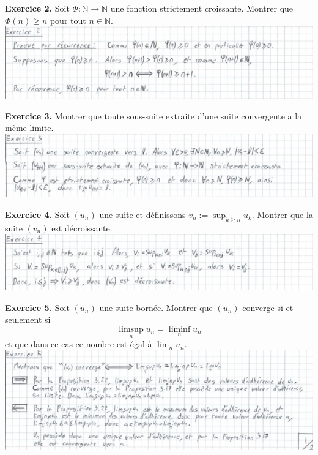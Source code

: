 \documentclass[a4paper, 10pt]{report}
\begin{document}
	\vspace{5mm}
	\noindent
	\textbf{Exercice 2.} Soit $\Phi: \mathbb{N} \to \mathbb{N}$ une
	fonction strictement croissante. Montrer que $\Phi(n) \geq n$
	pour tout $n \in \mathbb{N}$.\\
	
	\includegraphics{ex02.jpg}	
	
	\vspace{5mm}
	\noindent
	\textbf{Exercice 3.} Montrer que toute sous-suite extraite d'une
	suite convergente a la même limite.\\
	
	\includegraphics{ex03.jpg}
	
	\newpage
	
	\fancyhf{}
	\renewcommand{\headrule}
	{\rule{\textwidth}{0pt}}
	
	\noindent
	\textbf{Exercice 4.} Soit $(u_n)$ une suite et définissons
	$v_n := \sup_{k \geq n}u_k$. Montrer que la suite $(v_n)$ est
	décroissante.\\
	
	\includegraphics{ex04.jpg}
	
	\vspace{5mm}
	\noindent
	\textbf{Exercice 5.} Soit $(u_n)$ une suite bornée. Montrer que
	$(u_n)$ converge si et seulement si \[\limsup_n{u_n} = \liminf_n{u_n}\]
	et que dans ce cas ce nombre est égal à $\lim_n{u_n}$.\\
	
	\includegraphics{ex05.jpg}
	
\end{document}
